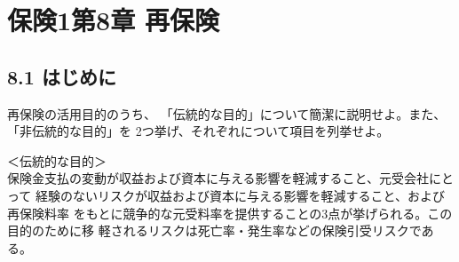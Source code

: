 \documentclass[report,gutter=10mm,fore-edge=10mm,uplatex,dvipdfmx]{jlreq}
\begin{document}
\chapter{保険1第8章 再保険}
\section{8.1 はじめに}
再保険の活用目的のうち、
「伝統的な目的」について簡潔に説明せよ。また、
「非伝統的な目的」を 2つ挙げ、それぞれについて項目を列挙せよ。
\answer{}

\noindent ＜伝統的な目的＞\\
保険金支払の変動が収益および資本に与える影響を軽減すること、元受会社にとって
経験のないリスクが収益および資本に与える影響を軽減すること、および再保険料率
をもとに競争的な元受料率を提供することの3点が挙げられる。この目的のために移
軽されるリスクは死亡率・発生率などの保険引受リスクである。
\end{document}
